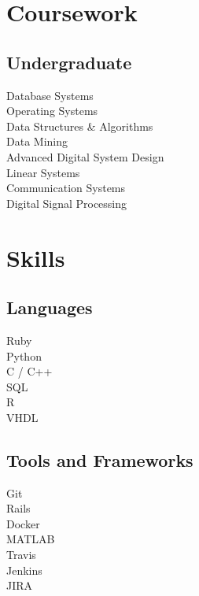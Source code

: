 \documentclass[letterpaper]{deedy-resume} %
\begin{document}
\begin{minipage}[t]{0.33\textwidth}

\section{Coursework}

\subsection{Undergraduate}

Database Systems \\
Operating Systems \\
Data Structures \& Algorithms \\
Data Mining \\
Advanced Digital System Design \\
Linear Systems \\
Communication Systems \\
Digital Signal Processing

\sectionspace %


\section{Skills}

\subsection{Languages}

Ruby \\
Python \\
C / C++ \\
SQL \\
R \\
VHDL \\

\sectionspace %

\subsection{Tools and Frameworks}

Git \\
Rails \\
Docker \\
MATLAB \\
Travis \\
Jenkins \\
JIRA


\end{minipage}
\end{document}
